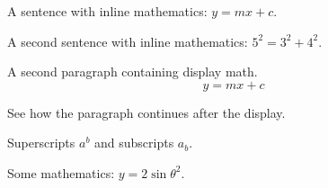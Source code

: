 \documentclass{article}
\begin{document}
A sentence with inline mathematics: $y = mx + c$.

A second sentence with inline mathematics: $5^{2}=3^{2}+4^{2}$.

A second paragraph containing display math.
\[
y = mx + c
\]

See how the paragraph continues after the display.

Superscripts $a^{b}$ and subscripts $a_{b}$.

Some mathematics: $y = 2 \sin \theta^{2}$.
\end{document}
